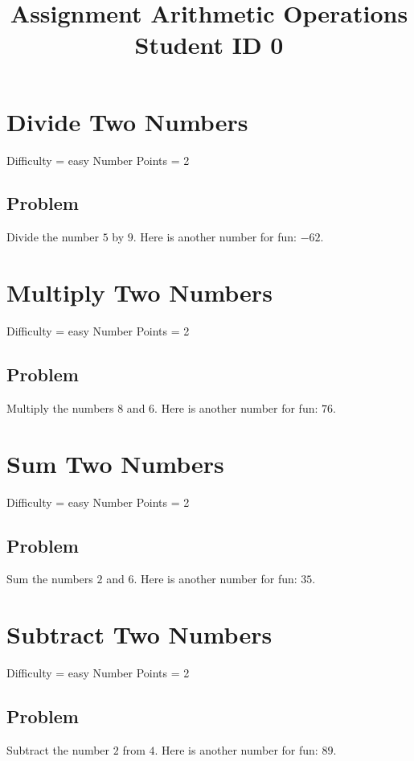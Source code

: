 \documentclass{article}
\title{Assignment Arithmetic Operations \\ Student ID 0}
\begin{document}
\maketitle

\section{Divide Two Numbers}
Difficulty = easy
Number Points = 2
\subsection{Problem}
Divide the number $5$ by $9$. Here is another number for fun: $-62$.
\vspace{6cm} 
\section{Multiply Two Numbers}
Difficulty = easy
Number Points = 2
\subsection{Problem}
Multiply the numbers $8$ and $6$. Here is another number for fun: $76$.
\vspace{6cm} 
\section{Sum Two Numbers}
Difficulty = easy
Number Points = 2
\subsection{Problem}
Sum the numbers $2$ and $6$. Here is another number for fun: $35$.
\vspace{6cm} 
\section{Subtract Two Numbers}
Difficulty = easy
Number Points = 2
\subsection{Problem}
Subtract the number $2$ from $4$. Here is another number for fun: $89$.
\vspace{6cm} 
\end{document}
